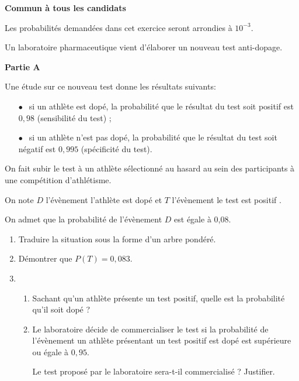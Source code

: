 
\textbf{Commun à tous les candidats}

\medskip


Les probabilités demandées dans cet exercice seront arrondies à $10^{-3}$.

\medskip

Un laboratoire pharmaceutique vient d'élaborer un nouveau test anti-dopage. 

\bigskip

\textbf{Partie A}

\medskip

Une étude sur ce nouveau test donne les résultats suivants:

\setlength\parindent{9mm}
\begin{itemize}
\item[$\bullet~~$] si un athlète est dopé, la probabilité que le résultat du test soit positif est $0,98$ (sensibilité du test) ;
\item[$\bullet~~$]si un athlète n'est pas dopé, la probabilité que le résultat du test soit négatif est $0,995$ (spécificité du test).
\end{itemize}
\setlength\parindent{0mm}

\smallskip

On fait subir le test à un athlète sélectionné au hasard au sein des participants à une compétition d'athlétisme. 

On note $D$ l'évènement \og l'athlète est dopé \fg{} et $T$ l'évènement \og le test est positif \fg. 

On admet que la probabilité de l'évènement $D$ est égale à 0,08.

\medskip

\begin{enumerate}
\item Traduire la situation sous la forme d'un arbre pondéré.
\item Démontrer que $P(T) = 0,083$.
\item 
	\begin{enumerate}
		\item Sachant qu'un athlète présente un test positif, quelle est la probabilité qu'il soit dopé ?
		\item Le laboratoire décide de commercialiser le test si la probabilité de l'évènement \og un athlète présentant un test positif est dopé \fg{} est supérieure ou égale à $0,95$.

Le test proposé par le laboratoire sera-t-il commercialisé ? Justifier.
	\end{enumerate}
\end{enumerate}

